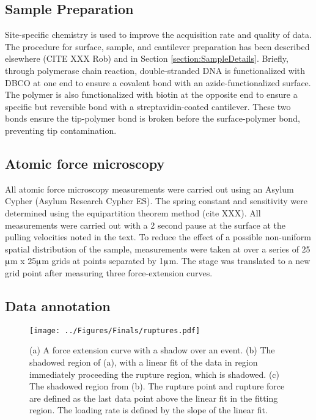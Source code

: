 \documentclass[%
  aip,12pt,tightenlines,
  amsthm,
 amsmath,amssymb
]{article}
\newcommand{\sRef}[1]{Section \ref{section:#1}}
\newcommand{\fLabel}[1]{\label{figure:#1}}
\newcommand{\sLabel}[1]{\label{section:#1}}
\newcommand{\firstp}[0]{}
\newcommand{\pl}[0]{\vspace{6pt}}
\newcommand{\figwidth}[0]{\linewidth}
\newcommand{\supply}[2]{(#1 #2)}
\begin{document}
\subsection{Sample Preparation}

\firstp Site-specific chemistry is used to improve the acquisition rate and quality of data. The procedure for surface, sample, and cantilever preparation has been described elsewhere (CITE XXX Rob) and in \sRef{SampleDetails}. Briefly, through polymerase chain reaction, double-stranded DNA is functionalized with DBCO at one end to ensure a covalent bond with an azide-functionalized surface. The polymer is also functionalized with biotin at the opposite end to ensure a specific but reversible bond with a streptavidin-coated cantilever. These two bonds ensure the tip-polymer bond is broken before the surface-polymer bond, preventing tip contamination. \pl

\subsection{\sLabel{Surface}Atomic force microscopy}

\firstp All atomic force microscopy measurements were carried out using an Asylum Cypher \supply{Asylum Research}{Cypher ES}. The spring constant and sensitivity were determined using the equipartition theorem method (cite XXX). All measurements were carried out with a 2 second pause at the surface at the pulling velocities noted in the text. To reduce the effect of a possible non-uniform spatial distribution of the sample, measurements were taken at over a series of 25$\muup$m x 25$\muup$m grids at points separated by 1$\muup$m. The stage was translated to a new grid point after measuring three force-extension curves. \pl

\subsection{\sLabel{Annotation}Data annotation}


\begin{figure}
\centering
\texttt{[image: ../Figures/Finals/ruptures.pdf]}%
\caption[Definition of rupture force and loading rate]{\fLabel{Rupture} (a) A force extension curve with a shadow over an event. (b) The shadowed region of (a), with a linear fit of the data in region immediately proceeding the rupture region, which is shadowed. (c) The shadowed region from (b). The rupture point and rupture force are defined as the last data point above the linear fit in the fitting region. The loading rate is defined by the slope of the linear fit. }
\end{figure}
\end{document}
